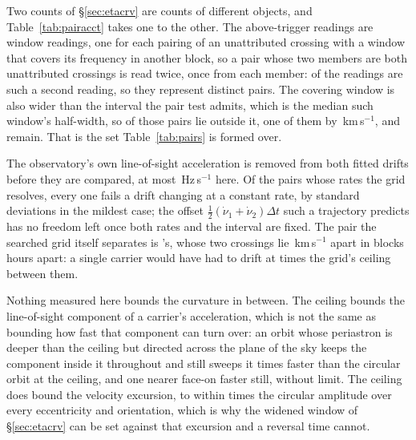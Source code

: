 Two counts of \S\ref{sec:etacrv} are counts of different objects, and
Table~\ref{tab:pairacct} takes one to the other. The \WdNExc{} above-trigger
readings are window readings, one for each pairing of an unattributed
crossing with a window that covers its frequency in another block, so a pair
whose two members are both unattributed crossings is read twice, once from
each member: \PaNPairTwice{} of the readings are such a second reading, so
they represent \PaNPairRead{} distinct pairs. The covering window is also
wider than the interval the pair test admits, which is the median such
window's half-width, so \PaNPairBeyond{} of those pairs lie outside it, one
of them by \PaDvBeyondMax\,km\,s$^{-1}$, and \PaNPairInside{} remain. That is
the set
Table~\ref{tab:pairs} is formed over.

The observatory's own line-of-sight acceleration is removed from both fitted
drifts before they are compared, at most \TjFrameMaxHzS\,Hz\,s$^{-1}$ here.
Of the \TjNPower{} pairs whose rates the grid resolves, every one fails a
drift changing at a constant rate, by \TjSigMin{} standard deviations in the
mildest case; the offset $\frac{1}{2}(\dot\nu_1+\dot\nu_2)\Delta t$ such a
trajectory predicts has no freedom left once both rates and the interval are
fixed. The pair the searched grid itself separates is \EcGridStar's, whose
two crossings lie \EcGridDvKms\,km\,s$^{-1}$ apart in blocks
\EcGridDtH\,hours apart: a single carrier would have had to drift at
\EcGridFactor{} times the grid's ceiling between them.

Nothing measured here bounds the curvature in between. The ceiling bounds the
line-of-sight component of a carrier's acceleration, which is not the same as
bounding how fast that component can turn over: an orbit whose periastron is
deeper than the ceiling but directed across the plane of the sky keeps the
component inside it throughout and still sweeps it \EcRateSupFac{} times
faster than the circular orbit at the ceiling, and one nearer face-on faster
still, without limit. The ceiling does bound the velocity excursion,
to within \EcVsupFac{} times the circular amplitude over every eccentricity
and orientation, which is why the widened window of \S\ref{sec:etacrv} can be
set against that excursion and a reversal time cannot.

